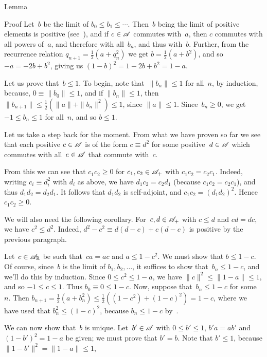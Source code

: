 \documentclass[main]{subfiles}
\begin{document}
\begin{parsec}
\begin{point}{Lemma}
\begin{point}{Proof}
Let~$b$ be the limit of $b_0\leq b_1\leq\dotsb$.
Then~$b$ being the limit of positive elements
is positive
(see~),
and if $c\in \mathscr{A}$ commutes with~$a$,
then $c$ commutes with all powers of~$a$,
and therefore with all~$b_n$,
and thus with~$b$.
Further, 
from the recurrence relation $q_{n+1} = \frac{1}{2}(a+q_n^2)$
we get $b=\frac{1}{2}(a+b^2)$,
and so $-a = -2b+b^2$, 
giving us  $(1-b)^2 = 1-2b+b^2 = 1-a$.

Let us prove that~$b\leq 1$.
To begin, note that~$\|b_n\|\leq 1$ for all~$n$, by induction,
because, $0\equiv \|b_0\|\leq 1$,
and if $\|b_n\|\leq 1$, then $\|b_{n+1}\|\leq \frac{1}{2}(\|a\|+\|b_n\|^2)
\leq 1$, since $\|a\|\leq 1$.
Since~$b_n\geq 0$, we get $-1\leq b_n\leq 1$ for all~$n$,
and so $b\leq 1$.

\begin{point}%
Let us take a step back for the moment.
From what we have proven so far
we see that each positive $c\in\mathscr{A}$
is of the form $c\equiv d^2$ for some positive~$d\in\mathscr{A}$
which commutes with all~$e\in \mathscr{A}$ that commute with~$c$.

From this we can see that $c_1c_2\geq 0$
for  
 $c_1,c_2 \in\mathscr{A}_{+}$
with $c_1c_2 = c_2c_1$.
Indeed, writing $c_i\equiv d_i^2$ with $d_i$ as above,
we have $d_1c_2=c_2d_1$ (because $c_1c_2=c_2c_1$), and thus 
$d_1d_2=d_2d_1$. It follows that $d_1d_2$ is self-adjoint,
and $c_1c_2 = (d_1d_2)^2$. Hence $c_1c_2\geq 0$.

We will also need the following corollary.
For~$c,d\in\mathscr{A}_{+}$ with $c\leq d$ and $cd=dc$,
we have $c^2\leq d^2$.
Indeed, $d^2-c^2 \equiv d(d-c)+c(d-c)$
is positive by the previous paragraph.
\end{point}
\begin{point}%
Let~$c\in\mathscr{A}_{\mathbb{R}}$ be such that~$ca=ac$ and  $a\leq 1-c^2$.
We must show that $b\leq 1-c$.
Of course,
since~$b$ is the limit of $b_1,b_2,\dotsc$,
it suffices to show that~$b_n\leq 1-c$,
and we'll do this by induction.
Since $0\leq c^2 \leq 1-a$,
 we have $\|c\|^2\leq \|1-a\|\leq 1$,
and so $-1\leq c\leq 1$.
Thus $b_0\equiv 0\leq 1-c$.
Now, suppose that~$b_n\leq 1-c$ for some~$n$.
Then $b_{n+1} = \frac{1}{2}(a+b_n^2)
\leq \frac{1}{2}( (1-c^2)+(1-c)^2) = 1-c$,
where we have used that $b_n^2 \leq (1-c)^2$,
because $b_n\leq 1-c$
by~.
\begin{point}%
We can now show that~$b$ is unique.
Let~$b'\in \mathscr{A}$ with $0\leq b'\leq 1$,
 $b'a=ab'$ and $(1-b')^2=1-a$ be given;
we must prove that $b'=b$.
Note that $b'\leq 1$,
because $\|1-b'\|^2=\|1-a\|\leq 1$,


\end{point}
\end{point}
\end{point}
\end{point}
\end{parsec}
\end{document}
